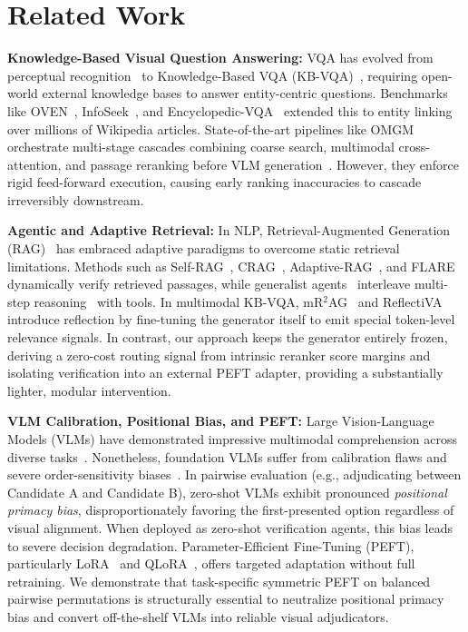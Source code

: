 \documentclass[conference]{IEEEtran}
\begin{document}
\section{Related Work}

\textbf{Knowledge-Based Visual Question Answering:} VQA has evolved from perceptual recognition~\cite{vqa_v2} to Knowledge-Based VQA (KB-VQA)~\cite{okvqa, aokvqa}, requiring open-world external knowledge bases to answer entity-centric questions. Benchmarks like OVEN~\cite{oven}, InfoSeek~\cite{infoseek}, and Encyclopedic-VQA~\cite{mensink2023evqa} extended this to entity linking over millions of Wikipedia articles. State-of-the-art pipelines like OMGM~\cite{omgm2025} orchestrate multi-stage cascades combining coarse search, multimodal cross-attention, and passage reranking before VLM generation~\cite{llava15}. However, they enforce rigid feed-forward execution, causing early ranking inaccuracies to cascade irreversibly downstream.

\textbf{Agentic and Adaptive Retrieval:} In NLP, Retrieval-Augmented Generation (RAG)~\cite{lewis2020rag, karpukhin2020dpr} has embraced adaptive paradigms to overcome static retrieval limitations. Methods such as Self-RAG~\cite{selfrag}, CRAG~\cite{crag}, Adaptive-RAG~\cite{adaptiverag}, and FLARE~\cite{jiang2023flare} dynamically verify retrieved passages, while generalist agents~\cite{react, toolformer} interleave multi-step reasoning~\cite{wei2022cot} with tools. In multimodal KB-VQA, mR$^{2}$AG~\cite{zhang2024mr2ag} and ReflectiVA~\cite{cocchi2025reflectiva} introduce reflection by fine-tuning the generator itself to emit special token-level relevance signals. In contrast, our approach keeps the generator entirely frozen, deriving a zero-cost routing signal from intrinsic reranker score margins and isolating verification into an external PEFT adapter, providing a substantially lighter, modular intervention.

\textbf{VLM Calibration, Positional Bias, and PEFT:} Large Vision-Language Models (VLMs) have demonstrated impressive multimodal comprehension across diverse tasks~\cite{llava15, blip2, dai2023instructblip, alayrac2022flamingo}. Nonetheless, foundation VLMs suffer from calibration flaws and severe order-sensitivity biases~\cite{primacy_bias, peiss_order_bias}. In pairwise evaluation (e.g., adjudicating between Candidate A and Candidate B), zero-shot VLMs exhibit pronounced \textit{positional primacy bias}, disproportionately favoring the first-presented option regardless of visual alignment. When deployed as zero-shot verification agents, this bias leads to severe decision degradation. Parameter-Efficient Fine-Tuning (PEFT), particularly LoRA~\cite{lora} and QLoRA~\cite{qlora}, offers targeted adaptation without full retraining. We demonstrate that task-specific symmetric PEFT on balanced pairwise permutations is structurally essential to neutralize positional primacy bias and convert off-the-shelf VLMs into reliable visual adjudicators.
\end{document}
